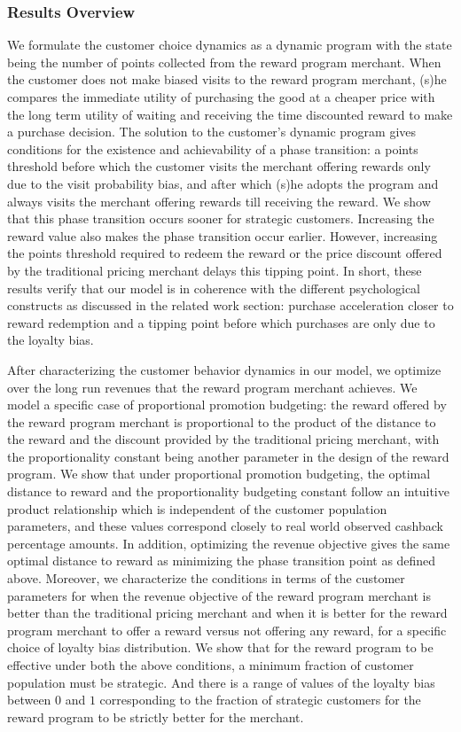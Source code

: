 \subsubsection{Results Overview}
We formulate the customer choice dynamics as a dynamic program with the state being the number of points collected from the reward program merchant.
When the customer does not make biased visits to the reward program merchant, (s)he compares the immediate utility of purchasing the good at a cheaper price with the long term utility of waiting and receiving the time discounted reward to make a purchase decision. 
The solution to the customer's dynamic program gives conditions for the existence and achievability of a phase transition: a points threshold before which the customer visits the merchant offering rewards only due to the visit probability bias, and after which (s)he adopts the program and always visits the merchant offering rewards till receiving the reward.
We show that this phase transition occurs sooner for strategic customers. Increasing the reward value also makes the phase transition occur earlier.
However, increasing the points threshold required to redeem the reward or the price discount offered by the traditional pricing merchant delays this tipping point.
In short, these results verify that our model is in coherence with the different psychological constructs as discussed in the related work section: purchase acceleration closer to reward redemption and a tipping point before which purchases are only due to the loyalty bias.

After characterizing the customer behavior dynamics in our model, we optimize over the long run revenues that the reward program merchant achieves.
We model a specific case of proportional promotion budgeting: the reward offered by the reward program merchant is proportional to the product of the distance to the reward and the discount provided by the traditional pricing merchant, with the proportionality constant being another parameter in the design of the reward program.
We show that under proportional promotion budgeting, the optimal distance to reward and the proportionality budgeting constant follow an intuitive product relationship which is independent of the customer population parameters,
and these values correspond closely to real world observed cashback percentage amounts.
In addition, optimizing the revenue objective gives the same optimal distance to reward as minimizing the phase transition point as defined above.
Moreover, we characterize the conditions in terms of the customer parameters for when the revenue objective of the reward program merchant is better than the traditional pricing merchant and when it is better for the reward program merchant to offer a reward versus not offering any reward, for a specific choice of loyalty bias distribution.
We show that for the reward program to be effective under both the above conditions, a minimum fraction of customer population must be strategic.
And there is a range of values of the loyalty bias between $0$ and $1$ corresponding to the fraction of strategic customers for the reward program to be strictly better for the merchant. 
